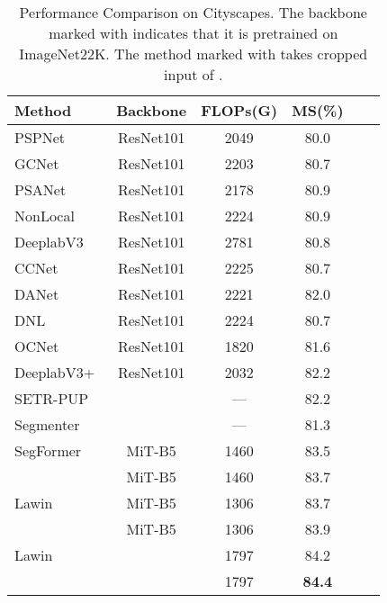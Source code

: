 \documentclass[10pt,twocolumn,letterpaper]{article}
\begin{document}
\begin{table}

\small
  \centering
  \renewcommand\arraystretch{1.15}
  
  \begin{tabular}{lccccc} \hline 
  
  \hline
  \small{Method} & Backbone & FLOPs(G) & MS(\%) \\
\hline
  PSPNet~\cite{zhao2017pyramid}  & ResNet101 & 2049 & 80.0 \\
   GCNet~\cite{cao2019gcnet}  & ResNet101 & 2203 & 80.7 \\
   PSANet~\cite{zhao2018psanet}  & ResNet101 & 2178 & 80.9 \\
   NonLocal~\cite{wang2018non}  & ResNet101 & 2224 & 80.9 \\
   DeeplabV3~\cite{chen2017rethinking} & ResNet101 & 2781 & 80.8 \\
   CCNet~\cite{huang2019ccnet}  & ResNet101 & 2225  & 80.7 \\
   DANet~\cite{fu2019dual}  & ResNet101 & 2221 & 82.0 \\
   DNL~\cite{yin2020disentangled}  & ResNet101 & 2224 & 80.7 \\
   OCNet~\cite{yuan2018ocnet} & ResNet101 & 1820 & 81.6 \\
   DeeplabV3+~\cite{chen2018encoder}  & ResNet101 & 2032 & 82.2 \\
   \hline
   SETR-PUP~\cite{zheng2021rethinking}  &  & --- & 82.2 \\
   Segmenter~\cite{strudel2021segmenter} &  & --- & 81.3 \\
   SegFormer~\cite{xie2021segformer}  & MiT-B5 & 1460 & 83.5 \\
    & MiT-B5 & 1460 & 83.7 \\
   Lawin & MiT-B5 & 1306 & 83.7 \\
    & MiT-B5 & 1306 & 83.9 \\
   Lawin  &  & 1797 & 84.2\\
     &  & 1797 & \textbf{84.4}\\
   
  \hline
  
  
  \hline
  
  \end{tabular} 
  \caption{Performance Comparison on Cityscapes. The backbone marked with  indicates that it is pretrained on ImageNet22K. The method marked with  takes cropped input of .   }
  \label{tb:city}
\end{table}
\end{document}
